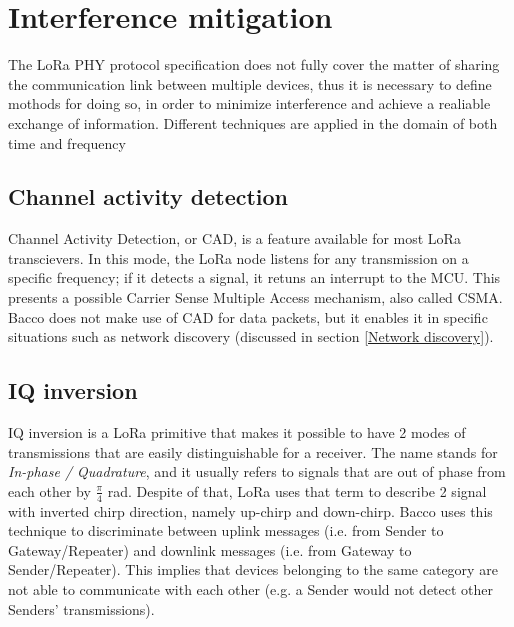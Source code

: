 \section{Interference mitigation}
The LoRa PHY protocol specification does not fully cover the matter of sharing the communication link between multiple
devices, thus it is necessary to define mothods for doing so, in order to minimize interference and achieve
a realiable exchange of information. Different techniques are applied in the domain of both time and frequency

\subsection{Channel activity detection}
Channel Activity Detection, or CAD, is a feature available for most LoRa transcievers\cite{cad}. In this mode, the LoRa node
listens for any transmission on a specific frequency; if it detects a signal, it retuns an interrupt to the MCU. This
presents a possible Carrier Sense Multiple Access mechanism, also called CSMA.\\
Bacco does not make use of CAD for data packets, but it enables it in specific situations such as network discovery (discussed
in section \ref{Network discovery}).

\subsection{IQ inversion}
IQ inversion is a LoRa primitive that makes it possible to have 2 modes of transmissions that are easily
distinguishable for a receiver. The name stands for \emph{In-phase / Quadrature}, and it usually refers to
signals that are out of phase from each other by $\frac{\pi}{4}$ rad. Despite of that, LoRa uses that term to describe
2 signal with inverted chirp direction, namely up-chirp and down-chirp. Bacco uses this technique to discriminate between uplink messages (i.e. from Sender to
Gateway/Repeater) and downlink messages (i.e. from Gateway to Sender/Repeater). This implies that devices belonging to
the same category are not able to communicate with each other (e.g. a Sender would not detect other Senders' transmissions).

